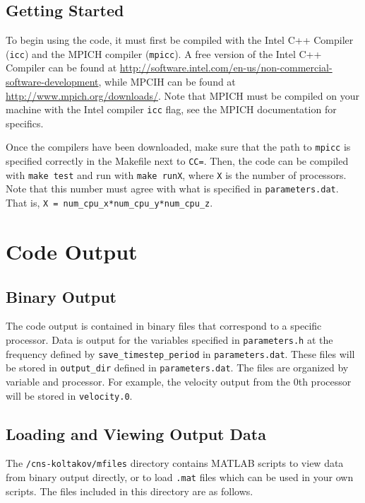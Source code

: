 \documentclass[12pt]{report}
\begin{document}
\section{Getting Started}\label{sec:start}
To begin using the code, it must first be compiled with the Intel C++ Compiler (\texttt{icc}) and the MPICH compiler (\texttt{mpicc}). A free version of the Intel C++ Compiler can be found at \url{http://software.intel.com/en-us/non-commercial-software-development}, while MPCIH can be found at \url{http://www.mpich.org/downloads/}. Note that MPICH must be compiled on your machine with the Intel compiler \texttt{icc} flag, see the MPICH documentation for specifics.

Once the compilers have been downloaded, make sure that the path to \texttt{mpicc} is specified correctly in the Makefile next to \texttt{CC=}. Then, the code can be compiled with \texttt{make test} and run with \texttt{make runX}, where \texttt{X} is the number of processors. Note that this number must agree with what is specified in \texttt{parameters.dat}. That is, \texttt{X = num\_cpu\_x*num\_cpu\_y*num\_cpu\_z}.

 
\chapter{Code Output}

\section{Binary Output}
The code output is contained in binary files that correspond to a specific processor. 
Data is output for the variables specified in \texttt{parameters.h} at the frequency 
defined by \texttt{save\_timestep\_period} in \texttt{parameters.dat}. These files will be stored in \texttt{output\_dir} defined in \texttt{parameters.dat}. The files are organized by variable and processor. For example, the velocity output from the 0th processor will be stored in \texttt{velocity.0}.

\section{Loading and Viewing Output Data}
The \texttt{/cns-koltakov/mfiles} directory contains MATLAB scripts to view data from binary output directly, or to load \texttt{.mat} files which can be used in your own scripts. The files included in this directory are as follows.
\end{document}
